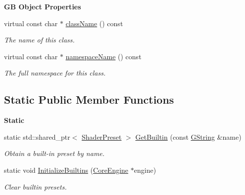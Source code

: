 \begin{Indent}\textbf{ GB Object Properties}\par
\begin{DoxyCompactItemize}
\item 
virtual const char $\ast$ \mbox{\hyperlink{classrev_1_1_shader_preset_a169c46262d1da9bfb67b26f2cf44e04e}{class\+Name}} () const
\begin{DoxyCompactList}\small\item\em The name of this class. \end{DoxyCompactList}\item 
virtual const char $\ast$ \mbox{\hyperlink{classrev_1_1_shader_preset_acd4d41f0101552e7512714eb307e24a8}{namespace\+Name}} () const
\begin{DoxyCompactList}\small\item\em The full namespace for this class. \end{DoxyCompactList}\end{DoxyCompactItemize}
\end{Indent}
\subsection*{Static Public Member Functions}
\begin{Indent}\textbf{ Static}\par
\begin{DoxyCompactItemize}
\item 
\mbox{\label{classrev_1_1_shader_preset_a73bb9ab02cb8610f6f8fe3d6ba61ff90}} 
static std\+::shared\+\_\+ptr$<$ \mbox{\hyperlink{classrev_1_1_shader_preset}{Shader\+Preset}} $>$ \mbox{\hyperlink{classrev_1_1_shader_preset_a73bb9ab02cb8610f6f8fe3d6ba61ff90}{Get\+Builtin}} (const \mbox{\hyperlink{classrev_1_1_g_string}{G\+String}} \&name)
\begin{DoxyCompactList}\small\item\em Obtain a built-\/in preset by name. \end{DoxyCompactList}\item 
\mbox{\label{classrev_1_1_shader_preset_a6447d2b8ff847822633142dddaa2cfc4}} 
static void \mbox{\hyperlink{classrev_1_1_shader_preset_a6447d2b8ff847822633142dddaa2cfc4}{Initialize\+Builtins}} (\mbox{\hyperlink{classrev_1_1_core_engine}{Core\+Engine}} $\ast$engine)
\begin{DoxyCompactList}\small\item\em Clear builtin presets. \end{DoxyCompactList}\end{DoxyCompactItemize}
\end{Indent}
